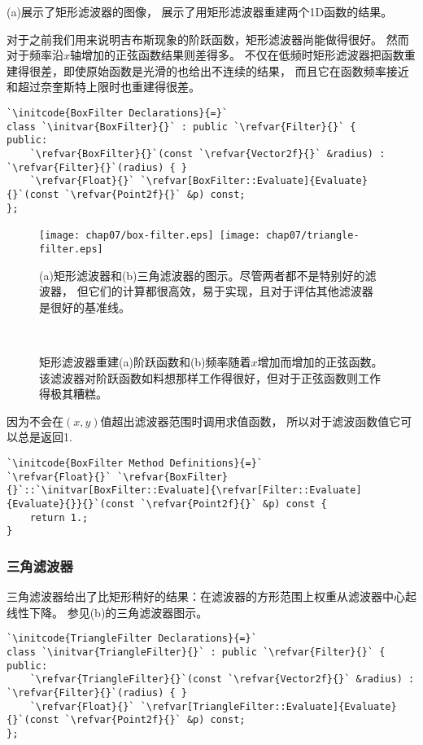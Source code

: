 (a)展示了矩形滤波器的图像，
展示了用矩形滤波器重建两个1D函数的结果。

对于之前我们用来说明吉布斯现象的阶跃函数，矩形滤波器尚能做得很好。
然而对于频率沿$x$轴增加的正弦函数结果则差得多。
不仅在低频时矩形滤波器把函数重建得很差，即使原始函数是光滑的也给出不连续的结果，
而且它在函数频率接近和超过奈奎斯特上限时也重建得很差。
\begin{lstlisting}
`\initcode{BoxFilter Declarations}{=}`
class `\initvar{BoxFilter}{}` : public `\refvar{Filter}{}` {
public:
    `\refvar{BoxFilter}{}`(const `\refvar{Vector2f}{}` &radius) : `\refvar{Filter}{}`(radius) { }
    `\refvar{Float}{}` `\refvar[BoxFilter::Evaluate]{Evaluate}{}`(const `\refvar{Point2f}{}` &p) const;
};
\end{lstlisting}

\begin{figure}[htbp]
    \centering
    \texttt{[image: chap07/box-filter.eps]}\,
    \texttt{[image: chap07/triangle-filter.eps]}
    \caption{(a)矩形滤波器和(b)三角滤波器的图示。尽管两者都不是特别好的滤波器，
        但它们的计算都很高效，易于实现，且对于评估其他滤波器是很好的基准线。}
    \label{fig:7.41}
\end{figure}
\begin{figure}[htbp]
    \centering
    \,
    \caption{矩形滤波器重建(a)阶跃函数和(b)频率随着$x$增加而增加的正弦函数。
        该滤波器对阶跃函数如料想那样工作得很好，但对于正弦函数则工作得极其糟糕。}
    \label{fig:7.42}
\end{figure}

因为不会在$(x,y)$值超出滤波器范围时调用求值函数，
所以对于滤波函数值它可以总是返回1.
\begin{lstlisting}
`\initcode{BoxFilter Method Definitions}{=}`
`\refvar{Float}{}` `\refvar{BoxFilter}{}`::`\initvar[BoxFilter::Evaluate]{\refvar[Filter::Evaluate]{Evaluate}{}}{}`(const `\refvar{Point2f}{}` &p) const {
    return 1.;
}
\end{lstlisting}

\subsubsection*{三角滤波器}
三角滤波器给出了比矩形稍好的结果：在滤波器的方形范围上权重从滤波器中心起线性下降。
参见(b)的三角滤波器图示。
\begin{lstlisting}
`\initcode{TriangleFilter Declarations}{=}`
class `\initvar{TriangleFilter}{}` : public `\refvar{Filter}{}` {
public:
    `\refvar{TriangleFilter}{}`(const `\refvar{Vector2f}{}` &radius) : `\refvar{Filter}{}`(radius) { }
    `\refvar{Float}{}` `\refvar[TriangleFilter::Evaluate]{Evaluate}{}`(const `\refvar{Point2f}{}` &p) const;
};
\end{lstlisting}

